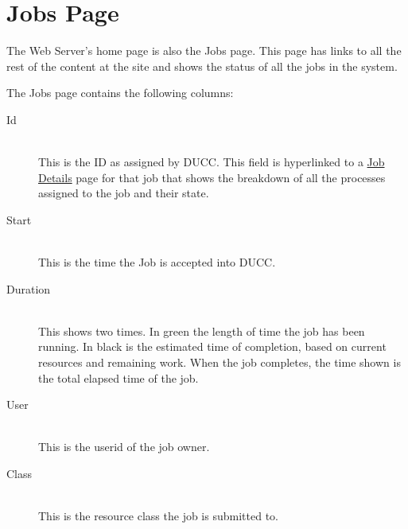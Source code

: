 
    \section{Jobs Page}
    \label{sec:ws.jobs-page}
        The Web Server's home page is also the Jobs page. This page has links to all the rest of the content 
        at the site and shows the status of all the jobs in the system. 
    
        The Jobs page contains the following columns: 

        \begin{description}

            \item[Id] \hfill \\
              This is the ID as assigned by DUCC. This field is hyperlinked to a
              \hyperref[sec:ws-job-details]{Job Details} page for that job that shows the breakdown of
              all the processes assigned to the job and their state.
              
            \item[Start] \hfill \\
              This is the time the Job is accepted into DUCC.
              
            \item[Duration] \hfill \\
              This shows two times.  In green the length of time the job has been running.  In black is
              the estimated time of completion, based on current resources and remaining work.  When
              the job completes, the time shown is the total elapsed time of the job.
                            
            \item[User] \hfill \\
              This is the userid of the job owner.
              
            \item[Class] \hfill \\
              This is the resource class the job is submitted to.
              

\end{description}
